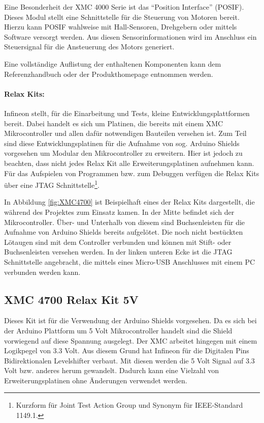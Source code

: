 Eine Besonderheit der XMC 4000 Serie ist das \enquote{Position Interface} (POSIF).
Dieses Modul stellt eine Schnittstelle für die Steuerung von Motoren bereit.
Hierzu kann POSIF wahlweise mit Hall-Sensoren, Drehgebern oder mittels Software versorgt werden.
Aus diesen Sensorinformationen wird im Anschluss ein Steuersignal für die Ansteuerung des Motors generiert.\cite{InfineonTechnologies2016a}

Eine vollständige Auflistung der enthaltenen Komponenten kann dem Referenzhandbuch \cite{InfineonTechnologies2016} oder der Produkthomepage \cite{InfineonTechnologies2017} entnommen werden.

\paragraph{Relax Kits:}
Infineon stellt, für die Einarbeitung und Tests, kleine Entwicklungsplattformen bereit.
Dabei handelt es sich um Platinen, die bereits mit einem XMC Mikrocontroller und allen dafür notwendigen Bauteilen versehen ist.
Zum Teil sind diese Entwicklungsplatinen für die Aufnahme von sog. Arduino Shields vorgesehen um Modular den Mikrocontroller zu erweitern.
Hier ist jedoch zu beachten, dass nicht jedes Relax Kit alle Erweiterungsplatinen aufnehmen kann.
Für das Aufspielen von Programmen bzw. zum Debuggen verfügen die Relax Kits über eine JTAG Schnittstelle\footnote{Kurzform für Joint Test Action Group und Synonym für IEEE-Standard 1149.1.}.

In Abbildung \ref{fig:XMC4700} ist Beispielhaft eines der Relax Kits dargestellt, die während des Projektes zum Einsatz kamen.
In der Mitte befindet sich der Mikrocontroller. 
Über- und Unterhalb von diesem sind Buchsenleisten für die Aufnahme von Arduino Shields bereits aufgelötet.
Die noch nicht bestückten Lötaugen sind mit dem Controller verbunden und können mit Stift- oder Buchsenleisten versehen werden.
In der linken unteren Ecke ist die JTAG Schnittstelle angebracht, die mittels eines Micro-USB Anschlusses mit einem PC verbunden werden kann. 

\subsection{XMC 4700 Relax Kit 5V}
\label{sec:XMC4700}
Dieses Kit ist für die Verwendung der Arduino Shields vorgesehen.
Da es sich bei der Arduino Plattform um 5 Volt Mikrocontroller handelt sind die Shield vorwiegend auf diese Spannung ausgelegt.
Der XMC arbeitet hingegen mit einem Logikpegel von 3.3 Volt.
Aus diesem Grund hat Infineon für die Digitalen Pins Bidirektionalen Levelshifter verbaut.
Mit diesen werden die 5 Volt Signal auf 3.3 Volt bzw. anderes herum gewandelt.
Dadurch kann eine Vielzahl von Erweiterungsplatinen ohne Änderungen verwendet werden.

